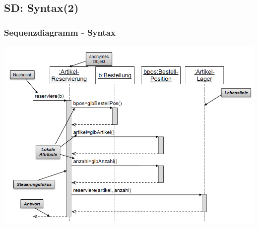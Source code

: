 \documentclass[18pt]{beamer}
\begin{document}
	\subsection{SD: Syntax(2)}
	\begin{frame}
		\frametitle{Sequenzdiagramm - Syntax}
			\includegraphics[scale=0.4]{./pics/tut2/sd_ex.png}
	\end{frame}
\end{document}
